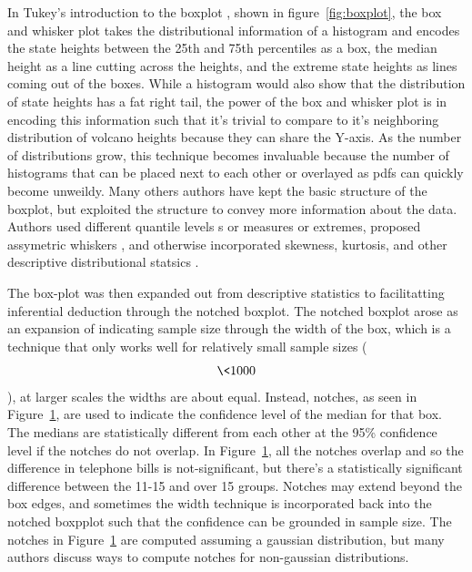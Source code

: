 In Tukey's introduction to the boxplot \cite{tukey1977}, shown in
figure~\ref{fig:boxplot}, the box and whisker plot takes the distributional information of a histogram and encodes the state heights between the
25th and 75th percentiles as a box, the median height as a line cutting across
the heights, and the extreme state heights as lines coming out of the
boxes. While a histogram would also show that the distribution of state heights has a fat right tail,
the power of the box and whisker plot is in encoding this information such that
it's trivial to compare to it's neighboring distribution of volcano
heights because they can share the Y-axis. As the number of distributions grow,
this technique becomes invaluable because the number of histograms that can be
placed next to each other or overlayed as pdfs can quickly become
unweildy.  Many others authors have kept the basic structure of the boxplot,
but exploited the structure to convey more information about the data. Authors used
different quantile levels \cite{Hyndman}s or measures or extremes\cite{Frigge,
carter}, proposed assymetric whiskers \cite{Rousseuw}, and otherwise incorporated skewness, kurtosis, and other descriptive distributional statsics \cite{ Aslam, choon, Marmelejo}.


\begin{figure}
\label{fig:notched}
\end{figure}
The box-plot was then expanded out from descriptive statistics to facilitatting
inferential deduction through the notched boxplot. \cite{mcgill1978} The notched boxplot
arose as an expansion of indicating sample size through the width of the box,
which is a technique that only works well for relatively small sample sizes ($$\<1000$$), at larger scales the widths are about equal. Instead, notches, as seen
in Figure~\ref{fig:notched}, are used to indicate the confidence level of the
median for that box. The medians are statistically different from each other at
the 95\% confidence level if the notches do not overlap. In
Figure~\ref{fig:notched}, all the notches overlap %
and so the difference in telephone bills is not-significant, but there's a
statistically significant difference between the 11-15 and over 15 groups. Notches may extend
beyond the box edges, and sometimes the width technique is incorporated back
into the notched boxpplot such that the confidence can be grounded in sample
size. The notches in Figure~\ref{fig:notched} are computed assuming a gaussian
distribution, but many authors \cite{x,y,z} discuss ways to compute notches for
non-gaussian distributions. 

